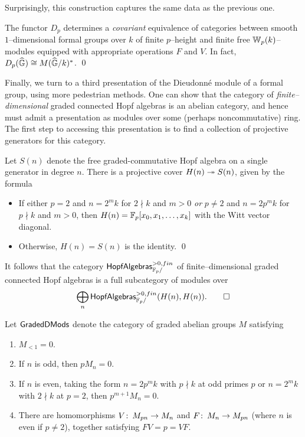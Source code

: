 Surprisingly, this construction captures the same data as the previous one.

\begin{theorem}
The functor $D_p$ determines a \emph{covariant} equivalence of categories between smooth $1$--dimensional formal groups over $k$ of finite $p$--height and finite free $\mathbb W_p(k)$--modules equipped with appropriate operations $F$ and $V$.  In fact, $D_p(\widehat{\mathbb G}) \cong M(\widehat{\mathbb G}/k)^*$. \qed {}
\end{theorem}

Finally, we turn to a third presentation of the Dieudonn\'e module of a formal group, using more pedestrian methods.  One can show that the category of \emph{finite--dimensional} graded connected Hopf algebras is an abelian category, and hence must admit a presentation as modules over some (perhaps noncommutative) ring.  The first step to accessing this presentation is to find a collection of projective generators for this category.

\begin{theorem}
Let $S(n)$ denote the free graded-commutative Hopf algebra on a single generator in degree $n$.  There is a projective cover $H(n) \twoheadrightarrow S(n)$, given by the formula
\begin{itemize}
\item If either $p = 2$ and $n = 2^m k$ for $2 \nmid k$ and $m > 0$ \emph{or} $p \ne 2$ and $n = 2p^m k$ for $p \nmid k$ and $m > 0$, then $H(n) = \mathbb F_p[x_0, x_1, \ldots, x_k]$ with the Witt vector diagonal.
\item Otherwise, $H(n) = S(n)$ is the identity.
\qed
\end{itemize}
\end{theorem}

\begin{corollary}
It follows that the category $\mathsf{HopfAlgebras}^{> 0, fin}_{\mathbb F_p/}$ of finite--dimensional graded connected Hopf algebras is a full subcategory of modules over \[\bigoplus_n \mathsf{HopfAlgebras}^{> 0, fin}_{\mathbb F_p/}(H(n), H(n)). \qed\]
\end{corollary}

\begin{definition}
Let $\mathsf{GradedDMods}$ denote the category of graded abelian groups $M$ satisfying
\begin{enumerate}
\item $M_{< 1} = 0$.
\item If $n$ is odd, then $pM_n = 0$.
\item If $n$ is even, taking the form $n = 2p^m k$ with $p \nmid k$ at odd primes $p$ or $n = 2^m k$ with $2 \nmid k$ at $p = 2$, then $p^{m+1} M_n = 0$.
\item There are homomorphisms $V\colon\thinspace M_{pn} \to M_n$ and $F\colon\thinspace M_n \to M_{pn}$ (where $n$ is even if $p \ne 2$), together satisfying $FV = p = VF$.
\end{enumerate}
\end{definition}

